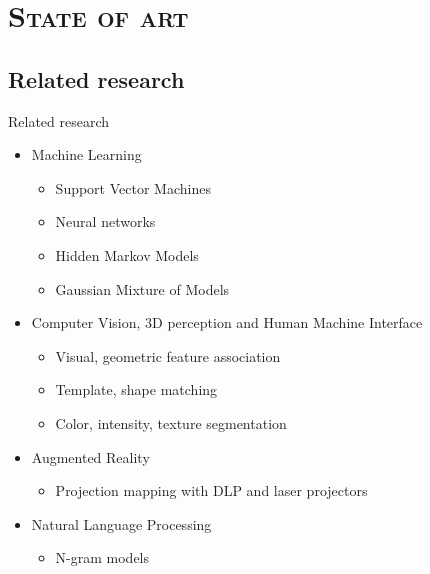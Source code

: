 \section{\scshape State of art}\label{sec:state-of-art}

\subsection{Related research}
\begin{frame}{Related research}
	\begin{itemize}
		\item Machine Learning
		\begin{itemize}
			\item Support Vector Machines
			\item Neural networks
			\item Hidden Markov Models
			\item Gaussian Mixture of Models
		\end{itemize}
		\item Computer Vision, 3D perception and Human Machine Interface
		\begin{itemize}
			\item Visual, geometric feature association
			\item Template, shape matching
			\item Color, intensity, texture segmentation
		\end{itemize}
		\item Augmented Reality
		\begin{itemize}
			\item Projection mapping with DLP and laser projectors
		\end{itemize}
		\item Natural Language Processing
		\begin{itemize}
			\item N-gram models
		\end{itemize}
	\end{itemize}
\end{frame}

